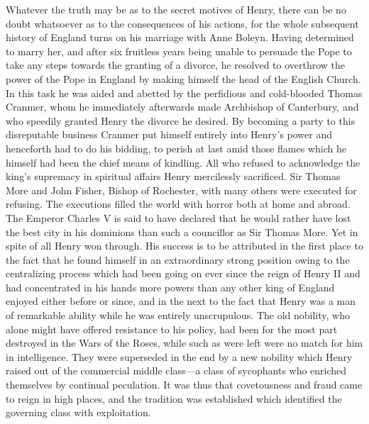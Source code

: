 \documentclass{book}
\begin{document}
Whatever the truth may be as to the secret motives of Henry, there can be no doubt whatsoever as to the consequences of his actions, for the whole subsequent history of England turns on his marriage with Anne Boleyn. Having determined to marry her, and after six fruitless years being unable to persuade the Pope to take any steps towards the granting of a divorce, he resolved to overthrow the power of the Pope in England by making himself the head of the English Church. In this task he was aided and abetted by the perfidious and cold-blooded Thomas Cranmer, whom he immediately afterwards made Archbishop of Canterbury, and who speedily granted Henry the divorce he desired. By becoming a party to this disreputable business Cranmer put himself entirely into Henry’s power and henceforth had to do his bidding, to perish at last amid those flames which he himself had been the chief means of kindling. All who refused to acknowledge the king’s supremacy in spiritual affairs Henry mercilessly sacrificed. Sir Thomas More and John Fisher, Bishop of Rochester, with many others were executed for refusing. The executions filled the world with horror both at home and abroad. The Emperor Charles V is said to have declared that he would rather have lost the best city in his dominions than such a councillor as Sir Thomas More. Yet in spite of all Henry won through. His success is to be attributed in the first place to the fact that he found himself in an extraordinary strong position owing to the centralizing process which had been going on ever since the reign of Henry II and had concentrated in his hands more powers than any other king of England enjoyed either before or since, and in the next to the fact that Henry was a man of remarkable ability while he was entirely unscrupulous. The old nobility, who alone might have offered resistance to his policy, had been for the most part destroyed in the Wars of the Roses, while such as were left were no match for him in intelligence. They were superseded in the end by a new nobility which Henry raised out of the commercial middle class—a class of sycophants who enriched themselves by continual peculation. It was thus that covetousness and fraud came to reign in high places, and the tradition was established which identified the governing class with exploitation.
\end{document}
